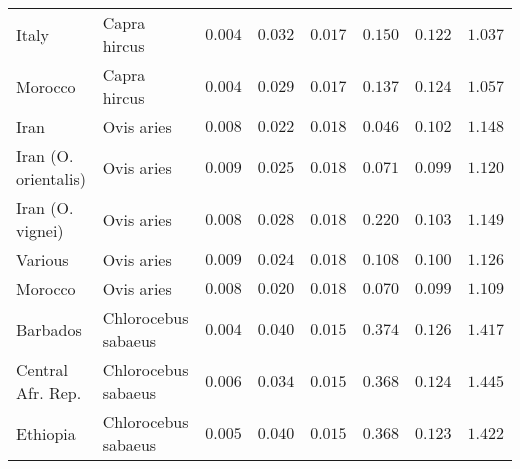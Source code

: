\documentclass{article}
\begin{document}
\begin{center}
\begin{longtable}{|l|l|r|r|r|r|r|r|}
            Italy                & Capra hircus        & $ 0.004$        & $ 0.032$                   & $ 0.017$                      & $ 0.150$                             & $ 0.122$                      & $ 1.037$           \\
            Morocco              & Capra hircus        & $ 0.004$        & $ 0.029$                   & $ 0.017$                      & $ 0.137$                             & $ 0.124$                      & $ 1.057$           \\
            Iran                 & Ovis aries          & $ 0.008$        & $ 0.022$                   & $ 0.018$                      & $ 0.046$                             & $ 0.102$                      & $ 1.148$           \\
            Iran (O. orientalis) & Ovis aries          & $ 0.009$        & $ 0.025$                   & $ 0.018$                      & $ 0.071$                             & $ 0.099$                      & $ 1.120$           \\
            Iran (O. vignei)     & Ovis aries          & $ 0.008$        & $ 0.028$                   & $ 0.018$                      & $ 0.220$                             & $ 0.103$                      & $ 1.149$           \\
            Various              & Ovis aries          & $ 0.009$        & $ 0.024$                   & $ 0.018$                      & $ 0.108$                             & $ 0.100$                      & $ 1.126$           \\
            Morocco              & Ovis aries          & $ 0.008$        & $ 0.020$                   & $ 0.018$                      & $ 0.070$                             & $ 0.099$                      & $ 1.109$           \\
            Barbados             & Chlorocebus sabaeus & $ 0.004$        & $ 0.040$                   & $ 0.015$                      & $ 0.374$                             & $ 0.126$                      & $ 1.417$           \\
            Central Afr. Rep.    & Chlorocebus sabaeus & $ 0.006$        & $ 0.034$                   & $ 0.015$                      & $ 0.368$                             & $ 0.124$ & $ 1.445$ \\
            Ethiopia             & Chlorocebus sabaeus & $ 0.005$        & $ 0.040$                   & $ 0.015$                      & $ 0.368$                             & $ 0.123$                      & $ 1.422$           \\

\end{longtable}
\end{center}
\end{document}
